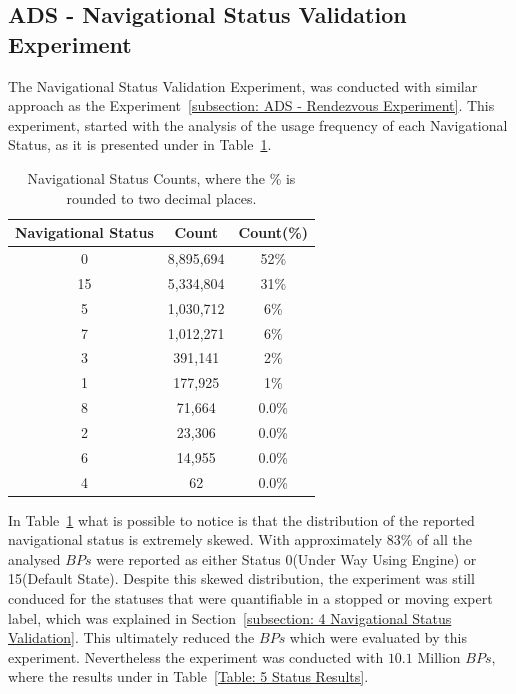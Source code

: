 \subsection{ADS - Navigational Status Validation Experiment}
\label{subsection: ADS - Navigational Status Experiment}
The Navigational Status Validation Experiment, was conducted with similar approach as the Experiment~\ref{subsection: ADS - Rendezvous Experiment}.
This experiment, started with the analysis of the usage frequency of each Navigational Status, as it is presented under in Table~\ref{Table: 5 Status Counts}.
\begin{table}[H]
\centering
\caption{Navigational Status Counts, where the \% is rounded to two decimal places.}
\label{Table: 5 Status Counts}
\begin{tabular}{@{}ccc@{}}
\toprule
Navigational Status & Count & Count(\%) \\ \midrule
0 & 8,895,694 & 52\% \\
15 & 5,334,804 & 31\% \\
5 & 1,030,712 & 6\% \\
7 & 1,012,271 & 6\% \\
3 & 391,141 & 2\% \\
1 & 177,925 & 1\% \\
8 & 71,664 & 0.0\% \\
2 & 23,306 & 0.0\% \\
6 & 14,955 & 0.0\% \\
4 & 62 & 0.0\% \\ \bottomrule
\end{tabular}
\end{table}

In Table~\ref{Table: 5 Status Counts} what is possible to notice is that the distribution of the reported navigational status is extremely skewed. With approximately $83\%$ of all the analysed $BPs$ were reported as either Status 0(Under Way Using Engine) or 15(Default State). 
Despite this skewed distribution, the experiment was still conduced for the statuses that were quantifiable in a stopped or moving expert label, which was explained in Section~\ref{subsection: 4 Navigational Status Validation}. 
This ultimately reduced the $BPs$ which were evaluated by this experiment. Nevertheless the experiment was conducted with $10.1$ Million $BPs$, where the results under in Table~\ref{Table: 5 Status Results}.
  

